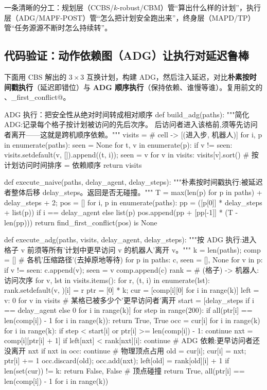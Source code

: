 一条清晰的分工：规划层（CCBS/$k$-robust/CBM）管“算出什么样的计划”，执行层（ADG/MAPF-POST）管“怎么把计划安全跑出来”，终身层（MAPD/TP）管“任务源源不断时怎么持续转”。

\subsection{代码验证：动作依赖图（ADG）让执行对延迟鲁棒}
\label{sec:mapf-adg-code}

下面用 CBS 解出的 $3\times 3$ 互换计划，构建 ADG，然后注入延迟，对比\textbf{朴素按时间戳执行}（延迟即错位）与 \textbf{ADG 顺序执行}（保持依赖、谁慢等谁）。复用前文的 \verb@cbs@、\verb@find_first_conflict@。

\begin{codebox}[Python]{ADG 执行：把安全性从绝对时间转成相对顺序}
def build_adg(paths):
    """简化 ADG:记录每个格子按计划被访问的先后次序。
    后访问者进入该格前,须等先访问者离开——这就是跨机顺序依赖。"""
    visits = {}                                   # cell -> [(进入步, 机器人)]
    for i, p in enumerate(paths):
        seen = None
        for t, v in enumerate(p):
            if v != seen: visits.setdefault(v, []).append((t, i)); seen = v
    for v in visits: visits[v].sort()             # 按计划访问时间排序 = 依赖顺序
    return visits

def execute_naive(paths, delay_agent, delay_steps):
    """朴素按时间戳执行:被延迟者整体后移 delay_steps。返回是否无碰撞。"""
    T = max(len(p) for p in paths) + delay_steps + 2; pos = []
    for i, p in enumerate(paths):
        pp = ([p[0]] * delay_steps + list(p)) if i == delay_agent else list(p)
        pos.append(pp + [pp[-1]] * (T - len(pp)))
    return find_first_conflict(pos) is None

def execute_adg(paths, visits, delay_agent, delay_steps):
    """按 ADG 执行:进入格子 v 前须等所有'计划中更早访问 v 的机器人'离开 v。"""
    k = len(paths); comp = []                      # 各机'压缩路径'(去掉原地等待)
    for p in paths:
        c, seen = [], None
        for v in p:
            if v != seen: c.append(v); seen = v
        comp.append(c)
    rank = {}                                      # (格子) -> {机器人: 访问次序}
    for v, lst in visits.items():
        for r, (t, i) in enumerate(lst): rank.setdefault(v, {})[i] = r
    ptr = [0] * k; cur = [comp[i][0] for i in range(k)]
    left = {v: 0 for v in visits}                  # 某格已被多少个'更早访问者'离开
    start = [delay_steps if i == delay_agent else 0 for i in range(k)]
    for step in range(200):
        if all(ptr[i] == len(comp[i]) - 1 for i in range(k)): return True, True
        occ = {cur[i] for i in range(k)}
        for i in range(k):
            if step < start[i] or ptr[i] >= len(comp[i]) - 1: continue
            nxt = comp[i][ptr[i] + 1]
            if left[nxt] < rank[nxt][i]: continue   # ADG 依赖:更早访问者还没离开 nxt
            if nxt in occ: continue                 # 物理顶点占用
            old = cur[i]; cur[i] = nxt; ptr[i] += 1
            occ.discard(old); occ.add(nxt); left[old] = rank[old][i] + 1
        if len(set(cur)) != k: return False, False  # 顶点碰撞
    return True, all(ptr[i] == len(comp[i]) - 1 for i in range(k))


\end{codebox}
